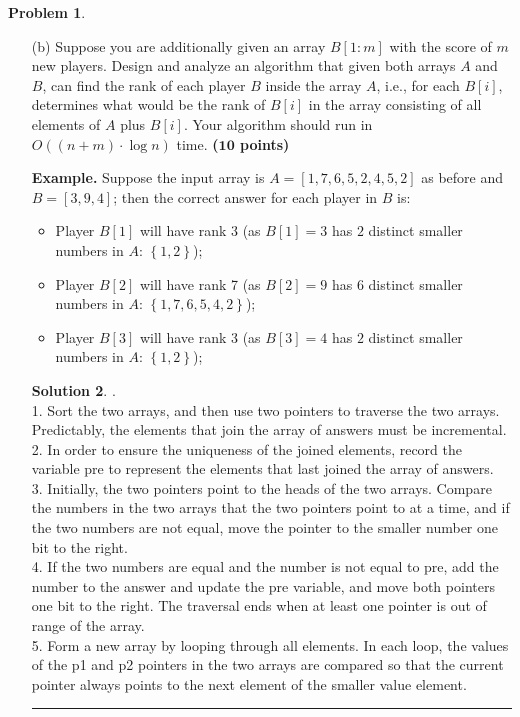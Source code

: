 \documentclass{article}
\theoremstyle{definition}
\newtheorem{problem}{Problem}
\def\fline{\rule{0.75\linewidth}{0.5pt}}
\newcommand{\finishline}{\begin{center}\fline\end{center}}
\newtheorem*{solution*}{Solution}
\newenvironment{solution}{\begin{solution*}}{{\finishline} \end{solution*}}
\newcommand{\grade}[1]{\hfill{\textbf{($\mathbf{#1}$ points)}}}
\newcommand{\set}[1]{\ensuremath{\left\{ #1 \right\}}}
\begin{document}
\begin{problem}
\begin{enumerate}
\begin{solution}
\end{solution}

    \item [(b)] Suppose you are additionally given an array $B[1:m]$ with the score of $m$ new players. Design and analyze an algorithm that given both arrays $A$ and $B$, can find the rank of each player $B$ inside the array $A$, i.e., 
    for each $B[i]$, determines what would be  the rank of $B[i]$ in the array consisting of all elements of $A$ plus $B[i]$. Your algorithm should run in $O((n+m) \cdot \log{n})$ time. \grade{10} 
      
      \medskip
  \textbf{Example.} Suppose the input array is $A=[1,7,6,5,2,4,5,2]$ as before and $B=[3,9,4]$; then the correct answer for each player in $B$ is: 
    \begin{itemize}
        \item Player $B[1]$ will have rank 3 (as $B[1]=3$ has $2$ distinct smaller numbers in $A$: $\set{1,2}$); 
        \item Player $B[2]$ will have rank 7 (as $B[2]=9$ has $6$ distinct smaller numbers in $A$: $\set{1,7,6,5,4,2}$);
        \item Player $B[3]$ will have rank 3 (as $B[3]=4$ has $2$ distinct smaller numbers in $A$: $\set{1,2}$);
    \end{itemize}
    
    
     	\begin{solution}.\\
		1. Sort the two arrays, and then use two pointers to traverse the two arrays. Predictably, the elements that join the array of answers must be incremental. \\ 
		2. In order to ensure the uniqueness of the joined elements, record the variable pre to represent the elements that last joined the array of answers. \\
		3. Initially, the two pointers point to the heads of the two arrays. Compare the numbers in the two arrays that the two pointers point to at a time, and if the two numbers are not equal, move the pointer to the smaller number one 		bit to the right. \\ 
		4. If the two numbers are equal and the number is not equal to pre, add the number to the answer and update the pre variable, and move both pointers one bit to the right. The traversal ends when at least one pointer is out of 		range of the array. \\
		5. Form a new array by looping through all elements. In each loop, the values of the p1 and p2 pointers in the two arrays are compared so that the current pointer always points to the next element of the smaller value element. 
		
\end{solution}

    
    \end{enumerate}
    
\end{problem}
\end{document}
